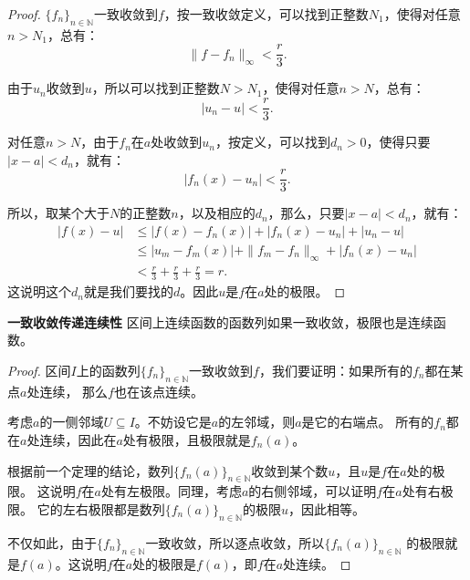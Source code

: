\documentclass[12pt,UTF8,fontset=none]{ctexbook}
\begin{document}
\begin{appendix}
\begin{proof}
    $\{f_n\}_{n\in\mathbb{N}}$一致收敛到$f$，按一致收敛定义，可以找到正整数$N_1$，使得对任意$n>N_1$，总有：
    $$ \| f - f_n\|_{\infty} < \frac{r}{3}.$$

    由于$u_n$收敛到$u$，所以可以找到正整数$N>N_1$，使得对任意$n>N$，总有：
    $$ |u_n - u| < \frac{r}{3}.$$
    
    对任意$n>N$，由于$f_n$在$a$处收敛到$u_n$，按定义，可以找到$d_n > 0$，使得只要$|x - a| < d_n$，就有：
    $$ |f_n(x) - u_n| < \frac{r}{3}.$$

    所以，取某个大于$N$的正整数$n$，以及相应的$d_n$，那么，只要$|x - a| < d_n$，就有：
    \begin{align*}
        |f(x) - u| &\leqslant |f(x) - f_n(x)| + |f_n(x) - u_n| + |u_n - u| \\
        &\leqslant |u_m - f_m(x)| + \| f_m - f_n\|_{\infty} + |f_n(x) - u_n| \\
        &< \frac{r}{3} + \frac{r}{3} + \frac{r}{3} = r.
    \end{align*}
    这说明这个$d_n$就是我们要找的$d$。因此$u$是$f$在$a$处的极限。
\end{proof}

\begin{tm}{\textbf{一致收敛传递连续性}}
    区间上连续函数的函数列如果一致收敛，极限也是连续函数。
\end{tm}

\begin{proof}
    区间$I$上的函数列$\{f_n\}_{n\in\mathbb{N}}$一致收敛到$f$，我们要证明：如果所有的$f_n$都在某点$a$处连续，
    那么$f$也在该点连续。

    考虑$a$的一侧邻域$U\subseteq I$。不妨设它是$a$的左邻域，则$a$是它的右端点。
    所有的$f_n$都在$a$处连续，因此在$a$处有极限，且极限就是$f_n(a)$。

    根据前一个定理的结论，数列$\{f_n(a)\}_{n\in\mathbb{N}}$收敛到某个数$u$，且$u$是$f$在$a$处的极限。
    这说明$f$在$a$处有左极限。同理，考虑$a$的右侧邻域，可以证明$f$在$a$处有右极限。
    它的左右极限都是数列$\{f_n(a)\}_{n\in\mathbb{N}}$的极限$u$，因此相等。
    
    不仅如此，由于$\{f_n\}_{n\in\mathbb{N}}$一致收敛，所以逐点收敛，所以$\{f_n(a)\}_{n\in\mathbb{N}}$
    的极限就是$f(a)$。这说明$f$在$a$处的极限是$f(a)$，即$f$在$a$处连续。

\end{proof}


\end{appendix}
\end{document}
